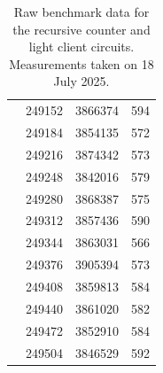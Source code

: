 \documentclass[runningheads]{llncs}
\begin{document}
\begin{table}[H]
\begin{tabular}{lr@{\hspace{2em}} S[table-format=6] @{\hspace{1em}} S[table-format=7,group-separator={,}] @{\hspace{1em}} S[table-format=3]}
     & 249152 & 3866374 & 594 \\
     & 249184 & 3854135 & 572 \\
     & 249216 & 3874342 & 573 \\
     & 249248 & 3842016 & 579 \\
     & 249280 & 3868387 & 575 \\
     & 249312 & 3857436 & 590 \\
     & 249344 & 3863031 & 566 \\
     & 249376 & 3905394 & 573 \\
     & 249408 & 3859813 & 584 \\
     & 249440 & 3861020 & 582 \\
     & 249472 & 3852910 & 584 \\
     & 249504 & 3846529 & 592 \\
    \bottomrule
  \end{tabular}
  \caption{Raw benchmark data for the recursive counter and light client circuits. Measurements taken on 18 July 2025.}
  \label{tab:raw_benchmark_data}
\end{table}

%


\end{document}

